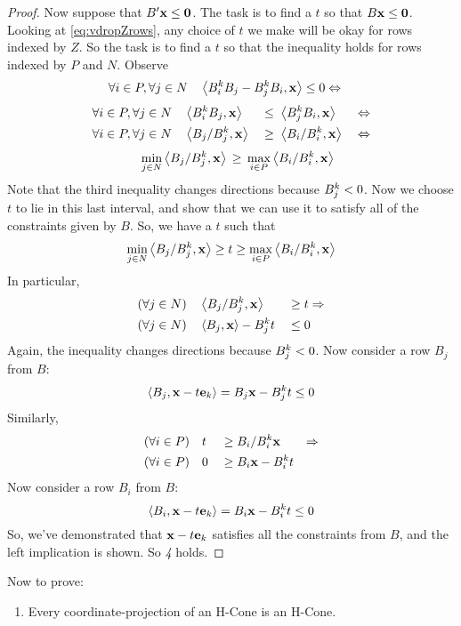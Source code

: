 \begin{proof}
  Now suppose that $B'\mathbf{x} \leq \mathbf{0}$.  The task is to find a $t$ so that $B\mathbf{x} \leq \mathbf{0}$.  Looking at \eqref{eq:vdropZrows}, any choice of $t$ we make will be okay for rows indexed by $Z$.  So the task is to find a $t$ so that the inequality holds for rows indexed by $P$ and $N$.  Observe
\begin{align*}
  \forall i\in P,\forall j \in N&\quad \left\langle B^k_i B_j - B^k_j B_i, \mathbf{x} \right\rangle \leq 0 \Leftrightarrow
\end{align*}
\vspace{-2.5em}
\begin{alignat*}{4}
  \forall i\in P,\forall j \in N&\quad \left\langle B^k_i B_j, \mathbf{x} \right\rangle &&\leq\; \left\langle B^k_j B_i, \mathbf{x} \right\rangle &\Leftrightarrow \\
  \forall i\in P,\forall j \in N&\quad \left\langle B_j/B^k_j, \mathbf{x} \right\rangle &&\geq\; \left\langle B_i/B^k_i, \mathbf{x} \right\rangle &\;\Leftrightarrow 
\end{alignat*}
\vspace{-2em}
\begin{align*}
   \quad\min_{j\in N}  \left\langle B_j/B^k_j, \mathbf{x} \right\rangle \,\geq\, \max_{i\in P} \left\langle B_i/B^k_i, \mathbf{x} \right\rangle
\end{align*}
Note that the third inequality changes directions because $B^k_j < 0$.  Now we choose $t$ to lie in this last interval, and show that we can use it to satisfy all of the constraints given by $ B$.  So, we have a $t$ such that
\[ \min_{j\in N}  \left\langle B_j/B^k_j, \mathbf{x} \right\rangle \geq t 
          \geq \max_{i\in P} \left\langle B_i/B^k_i, \mathbf{x} \right\rangle \]
In particular,
\begin{alignat*}{2}
 (\forall j\in N)\quad & \left\langle B_j/B^k_j, \mathbf{x} \right\rangle     \;&\geq&\; t \Rightarrow \\
 (\forall j\in N)\quad & \left\langle B_j, \mathbf{x} \right\rangle - B^k_j t \;&\leq&\; 0
\end{alignat*}
Again, the inequality changes directions because $B^k_j < 0$.  Now consider a row $ B_j$ from $ B$:
\[ \left\langle B_j, \mathbf{x}-t\mathbf{e}_k \right\rangle =  B_j {\mathbf{x}} - B^k_j t \leq 0 \]
Similarly,
\begin{alignat*}{3}
 (\forall i\in P)\quad & t \;&\geq&\;  B_i/B^k_i {\mathbf{x}} &\Rightarrow \\
 (\forall i\in P)\quad & 0 \;&\geq&\;  B_i {\mathbf{x}} - B^k_i t &
\end{alignat*}
Now consider a row $ B_i$ from $ B$:
\[ \left\langle B_i, \mathbf{x}-t\mathbf{e}_k \right\rangle =  B_i {\mathbf{x}} - B^k_i t \leq 0 \]
So, we've demonstrated that $\mathbf{x}-t\mathbf{e}_k$ satisfies all the constraints from $B$, and the left implication is shown.  So \textit{4} holds.
\end{proof}
Now to prove:
\begin{enumerate}
  \item[\Vproj] Every coordinate-projection of an H-Cone is an H-Cone.
\end{enumerate}

